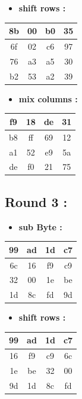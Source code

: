 \documentclass{article}
\begin{document}
\begin{itemize}
    \item \textbf{shift rows :}
\end{itemize} \begin{tabular}{|c|c|c|c|}
\hline 8b & 00 & b0 & 35 \\ \hline 6f & 02 & c6 & 97 \\ \hline 76 & a3 & a5 & 30 \\ \hline b2 & 53 & a2 & 39 \\ \hline \end{tabular}\hspace{0.5cm}\vspace{0.1cm}\begin{itemize}
    \item \textbf{mix columns :}
\end{itemize} \begin{tabular}{|c|c|c|c|}
\hline f9 & 18 & de & 31 \\ \hline b8 & ff & 69 & 12 \\ \hline a1 & 52 & e9 & 5a \\ \hline de & f0 & 21 & 75 \\ \hline \end{tabular}\hspace{0.5cm}\vspace{0.1cm}\subsection*{Round 3 : }\begin{itemize}
    \item \textbf{sub Byte :}
\end{itemize} \begin{tabular}{|c|c|c|c|}
\hline 99 & ad & 1d & c7 \\ \hline 6c & 16 & f9 & c9 \\ \hline 32 & 00 & 1e & be \\ \hline 1d & 8c & fd & 9d \\ \hline \end{tabular}\hspace{0.5cm}\vspace{0.1cm}\begin{itemize}
    \item \textbf{shift rows :}
\end{itemize} \begin{tabular}{|c|c|c|c|}
\hline 99 & ad & 1d & c7 \\ \hline 16 & f9 & c9 & 6c \\ \hline 1e & be & 32 & 00 \\ \hline 9d & 1d & 8c & fd \\ \hline \end{tabular}\hspace{0.5cm}\vspace{0.1cm}\begin{itemize}

\end{itemize}
\end{document}
